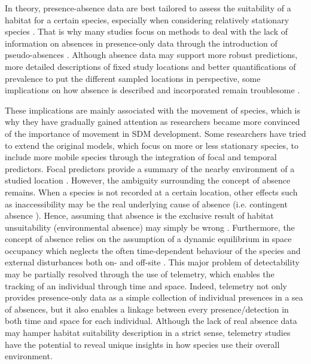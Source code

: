 \documentclass[12pt,authoryear]{elsarticle}
\begin{document}
In theory, presence-absence data are best tailored to assess the suitability of a habitat for a certain species, especially when considering relatively stationary species \citep{Elith2009}. That is why many studies focus on methods to deal with the lack of information on absences in presence-only data through the introduction of pseudo-absences \citep{Pearce2006,Aarts2012,Barbet-Massin2012}. Although absence data may support more robust predictions, more detailed descriptions of fixed study locations and better quantifications of prevalence to put the different sampled locations in perspective, some implications on how absence is described and incorporated remain troublesome \citep{Elith2009}. 

\vspace{5mm}

These implications are mainly associated with the movement of species, which is why they have gradually gained attention as researchers became more convinced of the importance of movement in SDM development. Some researchers have tried to extend the original models, which focus on more or less stationary species, to include more mobile species through the integration of focal and temporal predictors. Focal predictors provide a summary of the nearby environment of a studied location \citep{Bucklin2015}. However, the ambiguity surrounding the concept of absence remains. When a species is not recorded at a certain location, other effects such as inaccessibility may be the real underlying cause of absence (i.e. contingent absence \citep{Jimenez-valverde2008}). Hence, assuming that absence is the exclusive result of habitat unsuitability (environmental absence) may simply be wrong \citep{Miller2010}. Furthermore, the concept of absence relies on the assumption of a dynamic equilibrium in space occupancy which neglects the often time-dependent behaviour of the species and external disturbances both on- and off-site \citep{Elith2009}. This major problem of detectability may be partially resolved through the use of telemetry, which enables the tracking of an individual through time and space. Indeed, telemetry not only provides presence-only data as a simple collection of individual presences in a sea of absences, but it also enables a linkage between every presence/detection in both time and space for each individual. Although the lack of real absence data may hamper habitat suitability description in a strict sense, telemetry studies have the potential to reveal unique insights in how species use their overall environment. 
\end{document}
